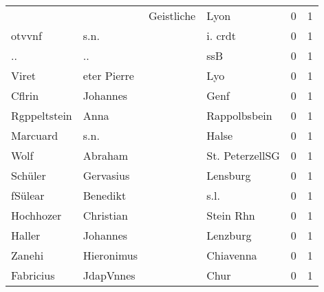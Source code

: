 \begin{center}
\begin{tiny}
\begin{longtabu}{llllrr}
                          &                                    &  Geistliche &                                        Lyon &          0 &         1 \\
                   otvvnf &                               s.n. &             &                                     i. crdt &          0 &         1 \\
                       .. &                                 .. &             &                                         ssB &          0 &         1 \\
                    Viret &                        eter Pierre &             &                                         Lyo &          0 &         1 \\
                   Cflrin &                           Johannes &             &                                        Genf &          0 &         1 \\
             Rgppeltstein &                               Anna &             &                                Rappolbsbein &          0 &         1 \\
                 Marcuard &                               s.n. &             &                                       Halse &          0 &         1 \\
                     Wolf &                            Abraham &             &                             St. PeterzellSG &          0 &         1 \\
                  Schüler &                          Gervasius &             &                                    Lensburg &          0 &         1 \\
                  fSülear &                           Benedikt &             &                                        s.l. &          0 &         1 \\
                Hochhozer &                          Christian &             &                                   Stein Rhn &          0 &         1 \\
                   Haller &                           Johannes &             &                                    Lenzburg &          0 &         1 \\
                   Zanehi &                         Hieronimus &             &                                   Chiavenna &          0 &         1 \\
                Fabricius &                          JdapVnnes &             &                                        Chur &          0 &         1 \\

\end{longtabu}
\end{tiny}
\end{center}
